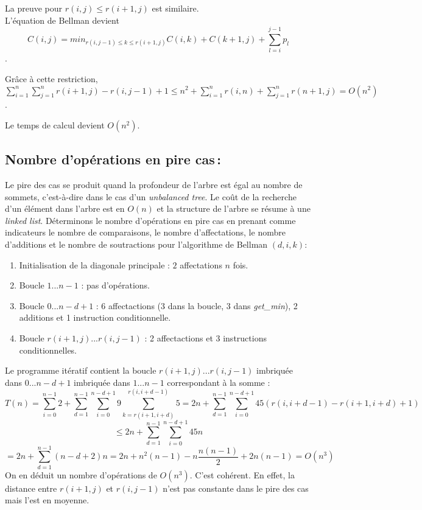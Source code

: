 \documentclass[a4paper, 10pt, french]{article}
\begin{document}
La preuve pour $r(i, j) \leq r(i + 1, j)$ est similaire. \\

L'équation de Bellman devient $$C(i, j) = min_{r(i, j - 1) \leq k \leq r(i + 1, j)} C(i, k) + C(k + 1, j) + \sum \limits_{l = i}^{j - 1} p_l$$.

Grâce à cette restriction, $\sum \limits_{i = 1}^{n} \sum \limits_{j = 1}^{n} r(i + 1, j) - r(i, j - 1) + 1 \leq n^2 + \sum \limits_{i = 1}^{n} r(i, n) + \sum \limits_{j = 1}^{n} r(n + 1, j) = O(n^2)$.

Le temps de calcul devient $O(n^2)$.
\subsection{Nombre  d'opérations en pire cas\,: }
Le pire des cas se produit quand la profondeur de l'arbre est égal au nombre de sommets, c'est-à-dire dans le cas d'un {\em unbalanced tree}. Le coût de la recherche d'un élément dans l'arbre est en $O(n)$ et la structure de l'arbre se résume à une {\em linked list}.
Déterminons le nombre d'opérations en pire cas en prenant comme indicateurs le nombre de comparaisons, le nombre d'affectations, le nombre d'additions et le nombre de soutractions pour l'algorithme de Bellman $(d, i, k)$:
\begin{enumerate}
  \item Initialisation de la diagonale principale : $2$ affectations $n$ fois.
  \item Boucle $1...n - 1$ : pas d'opérations.
  \item Boucle $0...n - d + 1$ : 6 affectactions (3 dans la boucle, 3 dans {\em get\_min}), 2 additions et 1 instruction conditionnelle.
  \item Boucle $r(i + 1, j)...r(i, j - 1)$ : 2 affectactions et 3 instructions conditionnelles.
\end{enumerate}
Le programme itératif contient la boucle $r(i + 1, j)...r(i, j - 1)$ imbriquée dans $0...n - d + 1$ imbriquée dans $1...n - 1$ correspondant à la somme :
$$T(n) = \sum_{i=0}^{n - 1} 2 + \sum_{d=1}^{n - 1} \sum_{i = 0}^{n - d + 1} 9\sum_{k=r(i + 1, i + d)}^{r(i, i + d - 1)} 5 = 2n + \sum_{d=1}^{n - 1} \sum_{i = 0}^{n - d + 1} 45 (r(i, i + d - 1) - r(i + 1, i + d) + 1)$$
$$\leq 2n + \sum_{d=1}^{n - 1} \sum_{i = 0}^{n - d + 1} 45n$$%
$$= 2n + \sum_{d=1}^{n - 1} (n - d + 2)n = 2n + n^2(n - 1) -n\frac{n(n - 1)}{2} + 2n(n - 1) = O(n^3)$$
On en déduit un nombre d'opérations de $O(n^3)$. C'est cohérent. En effet, la distance entre $r(i + 1, j)$ et $r(i, j - 1)$ n'est pas constante dans le pire des cas mais l'est en moyenne.
\end{document}
